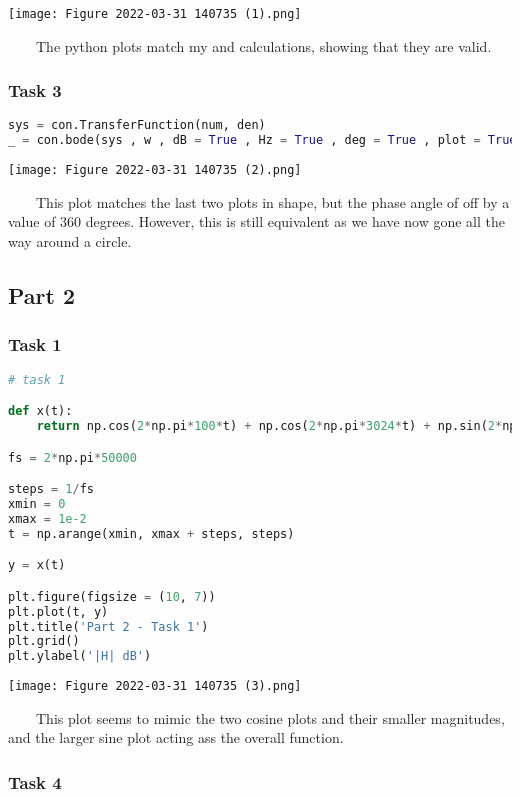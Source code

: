 \documentclass[11pt,a4]{article}
\begin{document}
\texttt{[image: Figure 2022-03-31 140735 (1).png]}

\ \ \ \ The python plots match my and calculations, showing that they are valid.

\subsubsection{Task 3}

\begin{lstlisting}[language=Python]
sys = con.TransferFunction(num, den)
_ = con.bode(sys , w , dB = True , Hz = True , deg = True , plot = True)
\end{lstlisting}

\texttt{[image: Figure 2022-03-31 140735 (2).png]}

\ \ \ \ This plot matches the last two plots in shape, but the phase angle of off by a value of 360 degrees. However, this is still equivalent as we have now gone all the way around a circle.

\subsection{Part 2}

\subsubsection{Task 1}

\begin{lstlisting}[language=Python]
# task 1

def x(t):
    return np.cos(2*np.pi*100*t) + np.cos(2*np.pi*3024*t) + np.sin(2*np.pi*50000*t)

fs = 2*np.pi*50000

steps = 1/fs
xmin = 0
xmax = 1e-2
t = np.arange(xmin, xmax + steps, steps)

y = x(t)

plt.figure(figsize = (10, 7))
plt.plot(t, y)
plt.title('Part 2 - Task 1')
plt.grid()
plt.ylabel('|H| dB')
\end{lstlisting}

\texttt{[image: Figure 2022-03-31 140735 (3).png]}

\ \ \ \ This plot seems to mimic the two cosine plots and their smaller magnitudes, and the larger sine plot acting ass the overall function.

\subsubsection{Task 4}
\end{document}
